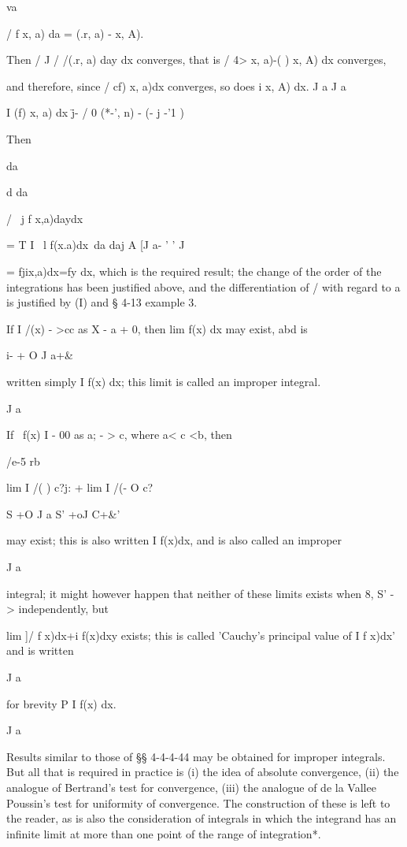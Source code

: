 va

/ f x, a) da = (.r, a) - x, A).

Then / J / /(.r, a) day dx converges, that is / 4> x, a)-( ) x, A) dx
converges,

and therefore, since / cf) x, a)dx converges, so does i x, A) dx. J a
J a

I (f) x, a) dx \=j- / 0 (*-', n) - (- j -'1 )

Then

da

d da

/ \ j f x,a)daydx\

= T I \ l f(x.a)dx\ da daj A [J a- ' ' J

= fjix,a)dx=fy dx, which is the required result; the change of the
order of the integrations has been justified above, and the
differentiation of / with regard to a is justified by  (I) and §
4-13 example 3.

%
%


If I /(x) - >cc as X - a + 0, then lim f(x) dx may exist, abd is

i- + O J a+\&

written simply I f(x) dx; this limit is called an improper integral.

J a

If \ f(x) I - 00 as a; - > c, where a< c <b, then

/e-5 rb

lim I /( ) c?j: + lim I /(- O c?

S +O J a S' +oJ C+\&'

may exist; this is also written I f(x)dx, and is also called an
improper

J a

integral; it might however happen that neither of these limits exists
when 8, S' - > independently, but

lim ]/ f x)dx+i f(x)dxy exists; this is called 'Cauchy's principal
value of I f x)dx' and is written

J a

for brevity P I f(x) dx.

J a

Results similar to those of §§ 4-4-4-44 may be obtained for improper
integrals. But all that is required in practice is (i) the idea of
absolute convergence, (ii) the analogue of Bertrand's test for
convergence, (iii) the analogue of de la Vallee Poussin's test for
uniformity of convergence. The construction of these is left to the
reader, as is also the consideration of integrals in which the
integrand has an infinite limit at more than one point of the range of
integration*.

